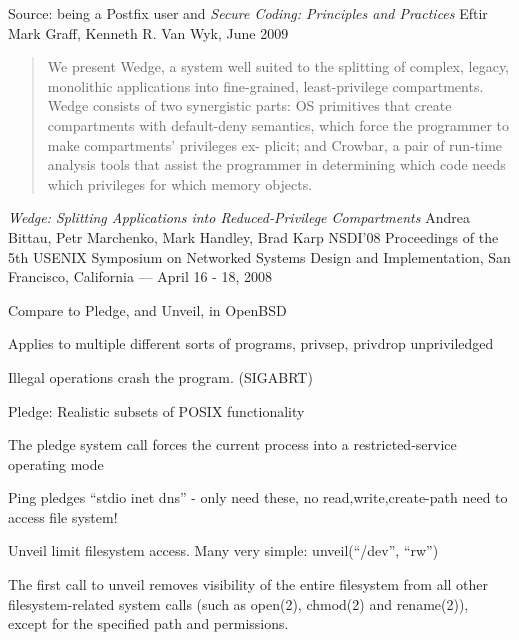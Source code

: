 \documentclass[Screen16to9,17pt]{foils}
\begin{document}
Source: being a Postfix user and \emph{Secure Coding: Principles and Practices}
Eftir Mark Graff, Kenneth R. Van Wyk, June 2009



\begin{quote}
We present Wedge, a system well suited to the
splitting of complex, legacy, monolithic applications into
fine-grained, least-privilege compartments. Wedge consists of two synergistic parts: OS primitives that create
compartments with default-deny semantics, which force
the programmer to make compartments’ privileges ex-
plicit; and Crowbar, a pair of run-time analysis tools
that assist the programmer in determining which code
needs which privileges for which memory objects.
\end{quote}

\emph{Wedge: Splitting Applications into Reduced-Privilege Compartments}
Andrea Bittau, Petr Marchenko, Mark Handley, Brad Karp
NSDI'08 Proceedings of the 5th USENIX Symposium on Networked Systems Design and Implementation, San Francisco, California — April 16 - 18, 2008


Compare to Pledge, and Unveil, in OpenBSD
\begin{list2}
\item Applies to multiple different sorts of programs, privsep, privdrop
unpriviledged
\item Illegal operations crash the program. (SIGABRT)
\item Pledge: Realistic subsets of POSIX functionality
\item The pledge system call forces the current process into a restricted-service operating mode\\
\item Ping pledges “stdio inet dns” - only need these, no read,write,create-path need to access file system!
\item Unveil limit filesystem access. Many very simple: unveil(“/dev”, “rw”)
\item The first call to unveil removes visibility of the entire filesystem from all other filesystem-related system calls (such as open(2), chmod(2) and rename(2)), except for the specified path and permissions.\\ 
\end{list2}
\end{document}
